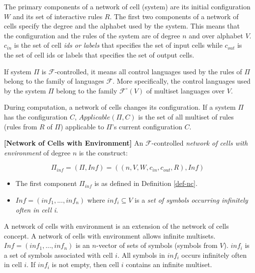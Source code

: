 \documentclass[a4paper]{article}
\theoremstyle{definition}
\begin{document}
The primary components of a network of cell (system) are its initial configuration $W$ and its set 
of interactive rules $R$. The first two components of a network of cells specify the degree and the 
alphabet used by the system. This means that the configuration and the rules of the system are of 
degree $n$ and over alphabet $V$. $c_{in}$ is the set of cell \emph{ids or labels} that specifies 
the set of input cells while $c_{out}$ is the set of cell ids or labels that specifies the set of 
output cells.

If system $\Pi$ is $\mathscr{F}$-controlled, it means all control languages used by the rules of
$\Pi$ belong to the family of languages $\mathscr{F}$. More specifically, the control languages used
by the system $\Pi$ belong to the family $\mathscr{F}^{\circ}(V)$ of multiset languages over $V$.

During computation, a network of cells changes its configuration. If a system $\Pi$ has the
configuration $C$, $Applicable(\Pi,C)$ is the set of all multiset of rules (rules from $R$ of $\Pi$) 
applicable to $\Pi$'s current configuration $C$.


\label{[def-nc2]}\textbf{[Network of Cells with Environment]} An 
$\mathscr{F}$-controlled \emph{network of cells with environment} of degree $n$ is the construct:

$$\Pi_{inf} = (\Pi,Inf) = ((n,V,W,c_{in},c_{out},R), Inf)$$
\begin{itemize}
\item The first component $\Pi_{inf}$ is as defined in Definition \ref{def-nc}.
\item $Inf = (inf_1,...,inf_n)$ where $inf_i \subseteq V$ is a \emph{set of symbols occurring 
infinitely often in cell i}.
\end{itemize}

A network of cells with environment is an extension of the network of cells concept. A network of
cells with environment allows infinite multisets. $Inf=(inf_1,...,inf_n)$ is an $n$-vector of sets 
of symbols (symbols from $V$). $inf_i$ is a set of symbols associated with cell $i$. All symbols in 
$inf_i$ occurs infinitely often in cell $i$. If $inf_i$ is not empty, then cell $i$ contains an
infinite multiset. 

\end{document}

